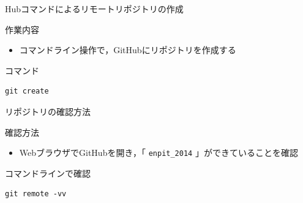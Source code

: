 \documentclass[12pt, t, aspectratio=169]{beamer}
\begin{document}
\begin{frame}[fragile,label=sec-2-3-2]{Hubコマンドによるリモートリポジトリの作成}
 \begin{block}{作業内容}
\begin{itemize}
\item コマンドライン操作で，GitHubにリポジトリを作成する
\end{itemize}
\end{block}
\begin{block}{コマンド}
\begin{verbatim}
git create
\end{verbatim}
\end{block}
\end{frame}

\begin{frame}[fragile,label=sec-2-3-3]{リポジトリの確認方法}
 \begin{block}{確認方法}
\begin{itemize}
\item WebブラウザでGitHubを開き，「 \texttt{enpit\_2014} 」ができていることを確認
\end{itemize}
\end{block}
\begin{block}{コマンドラインで確認}
\begin{verbatim}
git remote -vv
\end{verbatim}
\end{block}
\end{frame}
\end{document}
